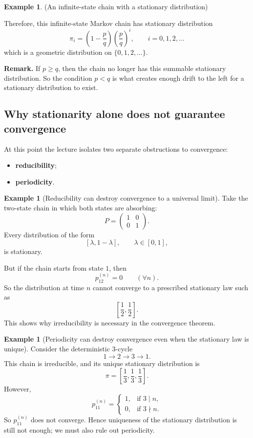 \documentclass[11pt]{article}
\theoremstyle{definition}
\newtheorem{example}[theorem]{Example}
\begin{document}
\begin{example}{(An infinite-state chain with a stationary distribution)}
\medskip

\noindent
Therefore, this infinite-state Markov chain has stationary distribution
\[
\boxed{\pi_i=\left(1-\frac{p}{q}\right)\left(\frac{p}{q}\right)^i,\qquad i=0,1,2,\dots}
\]
which is a geometric distribution on \(\{0,1,2,\dots\}\).

\medskip

\noindent
\textbf{Remark.}
If \(p\ge q\), then the chain no longer has this summable stationary distribution. So the condition \(p<q\) is what creates enough drift to the left for a stationary distribution to exist.
\end{example}

\subsection{Why stationarity alone does not guarantee convergence}

At this point the lecture isolates two separate obstructions to convergence:
\begin{itemize}[leftmargin=2em]
    \item \textbf{reducibility};
    \item \textbf{periodicity}.
\end{itemize}

\begin{example}[Reducibility can destroy convergence to a universal limit]
Take the two-state chain in which both states are absorbing:
\[
P=
\begin{pmatrix}
1 & 0\\
0 & 1
\end{pmatrix}.
\]
Every distribution of the form
\[
[\lambda,1-\lambda],
\qquad \lambda\in[0,1],
\]
is stationary.

But if the chain starts from state \(1\), then
\[
p_{12}^{(n)}=0
\qquad (\forall n).
\]
So the distribution at time \(n\) cannot converge to a prescribed stationary law such as
\[
\left[\frac12,\frac12\right].
\]
This shows why irreducibility is necessary in the convergence theorem.
\end{example}

\begin{example}[Periodicity can destroy convergence even when the stationary law is unique]
Consider the deterministic \(3\)-cycle
\[
1\to 2\to 3\to 1.
\]
This chain is irreducible, and its unique stationary distribution is
\[
\pi=
\left[\frac13,\frac13,\frac13\right].
\]
However,
\[
p_{11}^{(n)}
=
\begin{cases}
1, & \text{if } 3\mid n,\\[0.3em]
0, & \text{if } 3\nmid n.
\end{cases}
\]
So \(p_{11}^{(n)}\) does not converge. Hence uniqueness of the stationary distribution is still not enough; we must also rule out periodicity.
\end{example}
\end{document}
